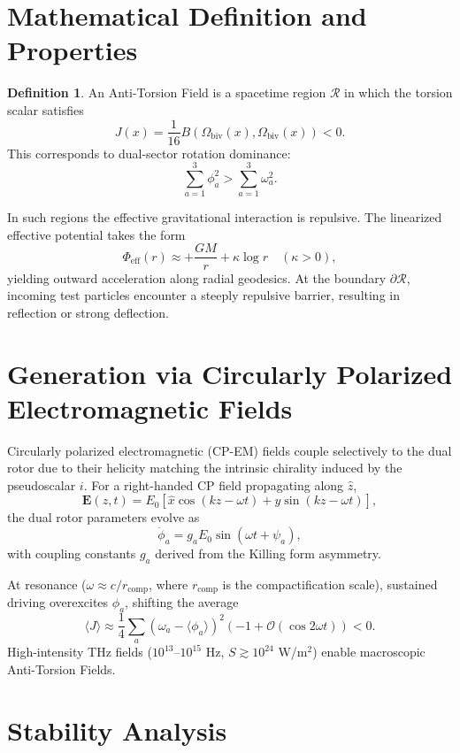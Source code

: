 \documentclass[dvipdfmx,11pt,a4paper]{article}
\theoremstyle{definition}
\newtheorem{definition}[theorem]{Definition}
\begin{document}
\section{Mathematical Definition and Properties}

\begin{definition}
An Anti-Torsion Field is a spacetime region $\mathcal{R}$ in which the torsion scalar satisfies
\[
J(x) = \frac{1}{16} B(\Omega_\text{biv}(x), \Omega_\text{biv}(x)) < 0.
\]
This corresponds to dual-sector rotation dominance:
\[
\sum_{a=1}^3 \phi_a^2 > \sum_{a=1}^3 \omega_a^2.
\]
\end{definition}

In such regions the effective gravitational interaction is repulsive. The linearized effective potential takes the form
\[
\Phi_\text{eff}(r) \approx +\frac{GM}{r} + \kappa \log r \quad (\kappa > 0),
\]
yielding outward acceleration along radial geodesics. At the boundary $\partial \mathcal{R}$, incoming test particles encounter a steeply repulsive barrier, resulting in reflection or strong deflection.

\section{Generation via Circularly Polarized Electromagnetic Fields}

Circularly polarized electromagnetic (CP-EM) fields couple selectively to the dual rotor due to their helicity matching the intrinsic chirality induced by the pseudoscalar $i$. For a right-handed CP field propagating along $\hat{z}$,
\[
\mathbf{E}(z,t) = E_0 \left[ \hat{x} \cos(kz - \omega t) + \hat{y} \sin(kz - \omega t) \right],
\]
the dual rotor parameters evolve as
\[
\dot{\phi}_a = g_a E_0 \sin(\omega t + \psi_a),
\]
with coupling constants $g_a$ derived from the Killing form asymmetry.

At resonance ($\omega \approx c / r_\text{comp}$, where $r_\text{comp}$ is the compactification scale), sustained driving overexcites $\phi_a$, shifting the average
\[
\langle J \rangle \approx \frac{1}{4} \sum_a (\omega_a - \langle \phi_a \rangle)^2 \left( -1 + \mathcal{O}(\cos 2\omega t) \right) < 0.
\]
High-intensity THz fields ($10^{13}$--$10^{15}$ Hz, $S \gtrsim 10^{24}$ W/m$^2$) enable macroscopic Anti-Torsion Fields.

\section{Stability Analysis}
\end{document}

